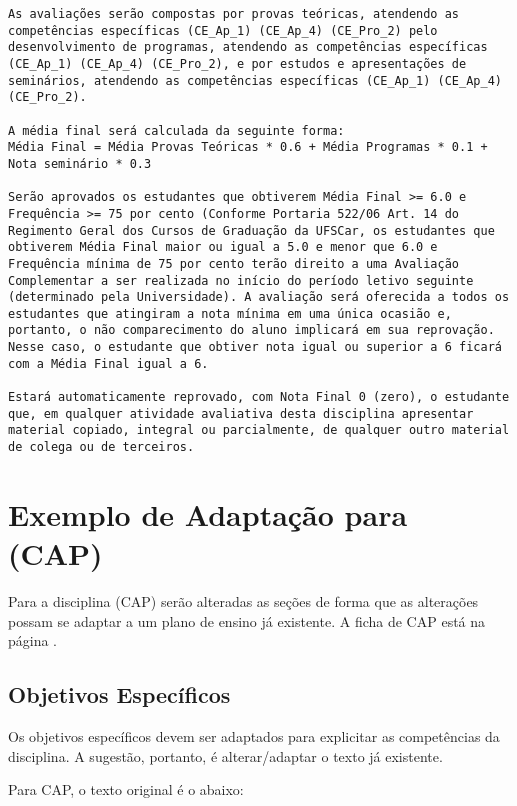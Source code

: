 \documentclass[12pt, oneside]{book}
\begin{document}
\begin{lstlisting}
As avaliações serão compostas por provas teóricas, atendendo as competências específicas (CE_Ap_1) (CE_Ap_4) (CE_Pro_2) pelo desenvolvimento de programas, atendendo as competências específicas (CE_Ap_1) (CE_Ap_4) (CE_Pro_2), e por estudos e apresentações de seminários, atendendo as competências específicas (CE_Ap_1) (CE_Ap_4) (CE_Pro_2).

A média final será calculada da seguinte forma:
Média Final = Média Provas Teóricas * 0.6 + Média Programas * 0.1 + Nota seminário * 0.3

Serão aprovados os estudantes que obtiverem Média Final >= 6.0 e Frequência >= 75 por cento (Conforme Portaria 522/06 Art. 14 do Regimento Geral dos Cursos de Graduação da UFSCar, os estudantes que obtiverem Média Final maior ou igual a 5.0 e menor que 6.0 e Frequência mínima de 75 por cento terão direito a uma Avaliação Complementar a ser realizada no início do período letivo seguinte (determinado pela Universidade). A avaliação será oferecida a todos os estudantes que atingiram a nota mínima em uma única ocasião e, portanto, o não comparecimento do aluno implicará em sua reprovação. Nesse caso, o estudante que obtiver nota igual ou superior a 6 ficará com a Média Final igual a 6.

Estará automaticamente reprovado, com Nota Final 0 (zero), o estudante que, em qualquer atividade avaliativa desta disciplina apresentar material copiado, integral ou parcialmente, de qualquer outro material de colega ou de terceiros.
\end{lstlisting}


\section{Exemplo de Adaptação para  (CAP)}

Para a disciplina  (CAP) serão alteradas as seções de forma que as alterações possam se adaptar a um plano de ensino já existente. A ficha de CAP está na página \pageref{cap}.

\subsection*{Objetivos Específicos}
Os objetivos específicos devem ser adaptados para explicitar as competências da disciplina. A sugestão, portanto, é alterar/adaptar o texto já existente.

Para CAP, o texto original é o abaixo:
\end{document}
